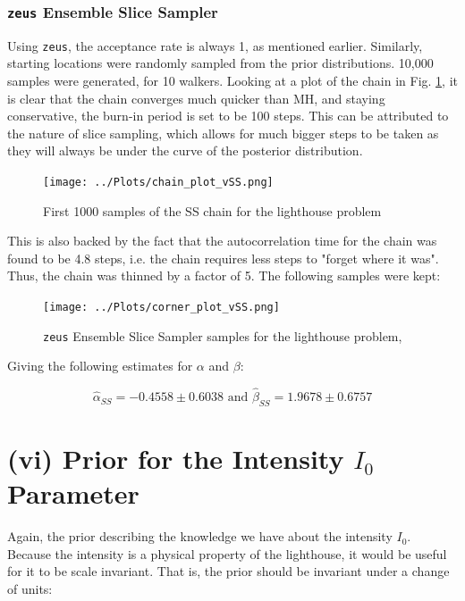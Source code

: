 \documentclass[12pt]{report} %
\begin{document}
\newpage
\subsection{\texttt{zeus} Ensemble Slice Sampler}

Using \texttt{zeus}, the acceptance rate is always 1, as mentioned earlier. Similarly, starting locations were randomly sampled from the prior distributions. 10,000 samples were generated, for 10 walkers. Looking at a plot of the chain in Fig. \ref{fig:SS_convergence}, it is clear that the chain converges much quicker than MH, and staying conservative, the burn-in period is set to be 100 steps. This can be attributed to the nature of slice sampling, which allows for much bigger steps to be taken as they will always be under the curve of the posterior distribution\cite{karamanis_zeus}.


\begin{figure}[h]
    \centering
    \texttt{[image: ../Plots/chain\_plot\_vSS.png]}
    \caption{First 1000 samples of the SS chain for the lighthouse problem}
    \label{fig:SS_convergence}
    \end{figure}

This is also backed by the fact that the autocorrelation time for the chain was found to be 4.8 steps, i.e. the chain requires less steps to "forget where it was". Thus, the chain was thinned by a factor of 5. The following samples were kept:

\newpage

\begin{figure}[h]
\centering
\texttt{[image: ../Plots/corner\_plot\_vSS.png]}
\caption{\texttt{zeus} Ensemble Slice Sampler samples for the lighthouse problem, }
\label{fig:SS_samples}
\end{figure}


Giving the following estimates for $\alpha$ and $\beta$:

\begin{equation}
    \hat{\alpha}_{SS} = -0.4558 \pm 0.6038 \text{ and } \hat{\beta}_{SS} = 1.9678 \pm 0.6757
\end{equation}

\chapter{(vi) Prior for the Intensity $I_{0}$ Parameter}

Again, the prior describing the knowledge we have about the intensity $I_{0}$. Because the intensity is a physical property of the lighthouse, it would be useful for it to be scale invariant\cite[pp.155-156]{FJames2006}. That is, the prior should be invariant under a change of units:
\end{document}
